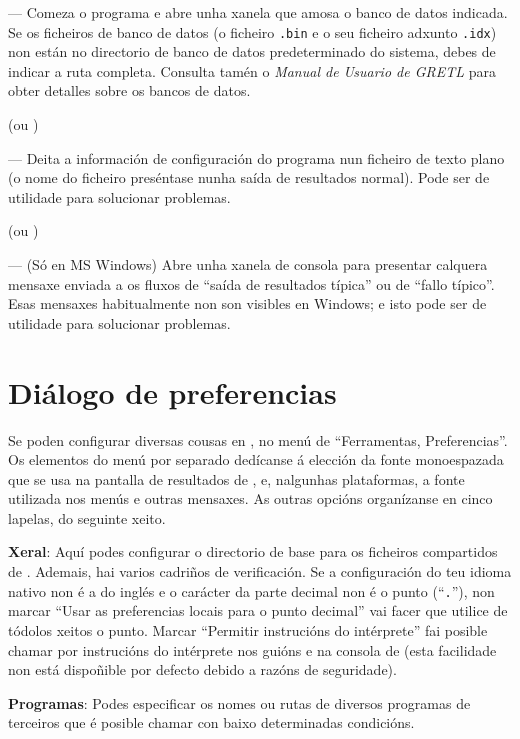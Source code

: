 --- Comeza o programa e abre unha xanela que amosa o banco de datos indicada.
Se os ficheiros de banco de datos (o ficheiro \texttt{.bin} e o seu ficheiro
adxunto \texttt{.idx}) non están no directorio de banco de datos predeterminado
do sistema, debes de indicar a ruta completa. Consulta tamén o
\emph{Manual de Usuario de GRETL} para obter detalles sobre os bancos de datos.
      
 (ou )
      
--- Deita a información de configuración do programa nun ficheiro de texto plano
(o nome do ficheiro preséntase nunha saída de resultados normal). Pode ser de
utilidade para solucionar problemas.
      
 (ou )

--- (Só en MS Windows) Abre unha xanela de consola para presentar calquera
mensaxe enviada a os fluxos de ``saída de resultados típica'' ou de
``fallo típico''. Esas mensaxes habitualmente non son visibles en Windows;
e isto pode ser de utilidade para solucionar problemas.
      
\section{Diálogo de preferencias}
\label{guiprefs}

Se poden configurar diversas cousas en , no menú de
``Ferramentas, Preferencias''. Os elementos do menú por separado dedícanse á
elección da fonte monoespazada que se usa na pantalla de resultados de ,
e, nalgunhas plataformas, a fonte utilizada nos menús e outras mensaxes.
As outras opcións organízanse en cinco lapelas, do seguinte xeito.
      
\textbf{Xeral}: Aquí podes configurar o directorio de base para os ficheiros
compartidos de . Ademais, hai varios cadriños de verificación.
Se a configuración do teu idioma nativo non é a do inglés e o carácter da
parte decimal non é o punto (``\texttt{.}''), non marcar ``Usar as preferencias
locais para o punto decimal'' vai facer que  utilice de tódolos
xeitos o punto. Marcar ``Permitir instrucións do intérprete'' fai posible
chamar por instrucións do intérprete nos guións e na consola de 
(esta facilidade non está dispoñible por defecto debido a razóns de seguridade).
      
\textbf{Programas}: Podes especificar os nomes ou rutas de diversos programas
de terceiros que é posible chamar con  baixo determinadas
condicións.

